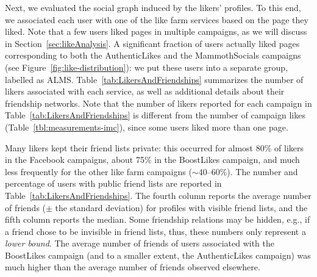 \documentclass[twocolumn,10pt,letterpaper]{article}
\begin{document}
\begin{table*}[t!]
\tabcolsep=0.11cm
\small
%
\centering
%
\caption{Likers and friendships between likers.}
\label{tab:LikersAndFriendships}
%
\end{table*}


Next, we evaluated the social graph induced by the likers' profiles.
%
To this end, we associated each user with one of the like farm services based on the page they liked. Note that a
few users liked pages in multiple campaigns, as we will discuss in Section~\ref{sec:likeAnalysis}.
A significant fraction of users actually liked pages corresponding to both the AuthenticLikes and the MammothSocials campaigns (see Figure~\ref{fig:like-distribution}): we put these users into a separate group, labelled as ALMS. Table~\ref{tab:LikersAndFriendships} summarizes the number of likers associated with each service, as well as additional details about their friendship networks. Note that the number of likers reported for each campaign in Table~\ref{tab:LikersAndFriendships} is different from the number of campaign likes (Table~\ref{tbl:measurements-imc}), since some users liked more than one page.

Many likers kept their friend lists private: this occurred for almost 80\% of likers in the Facebook campaigns, about 75\% in the BoostLikes campaign, and much less frequently for the other like farm campaigns ($\sim$40--60\%). The number and percentage of users  with public friend lists are reported in Table~\ref{tab:LikersAndFriendships}.
%
The fourth column reports the average number of friends ($\pm$ the standard deviation) for profiles with visible friend lists, and the fifth column reports the median.
Some friendship relations may be hidden, e.g., if a friend chose to be invisible in friend lists, thus, these numbers only represent a {\em lower bound}. The average number of friends of users associated with the BoostLikes campaign (and to a smaller extent, the AuthenticLikes campaign) was much higher than the average number of friends observed elsewhere.
\end{document}
